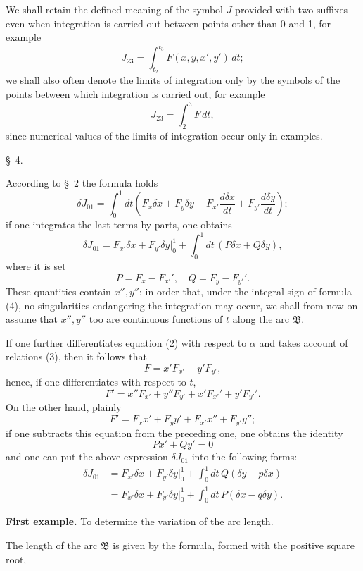 \documentclass[11pt,a4paper,leqno]{article}
\begin{document}
We shall retain the defined meaning of the symbol $J$ provided with two suffixes even when integration is carried out between points other than 0 and 1, for example
\[
 J_{23}=\int_{t_2}^{t_3}F(x,y,x',y')\,dt;
\]
we shall also often denote the limits of integration only by the symbols of the points between which integration is carried out, for example
\[
 J_{23}=\int_2^3 F\,dt,
\]
since numerical values of the limits of integration occur only in examples.


\begin{center}
\S~4.
\end{center}

According to \S~2 the formula holds
\[
\delta J_{01}=\int_0^1 dt\left(F_x\delta x+F_y\delta y+F_{x'}\frac{d\delta x}{dt}+F_{y'}\frac{d\delta y}{dt}\right);
\]
if one integrates the last terms by parts, one obtains
\[
\tag{4}
\delta J_{01}=F_{x'}\delta x+F_{y'}\delta y\bigg|_0^1+\int_0^1dt\,(P\delta x+Q\delta y),
\]
where it is set
\[
P=F_x-F_{x'}',\quad Q=F_y-F_{y'}'.
\]
These quantities contain \(x'',y''\); in order that, under the integral sign of formula (4), no singularities endangering the integration may occur, we shall from now on assume that \(x'',y''\) too are continuous functions of \(t\) along the arc \(\mathfrak B\).

If one further differentiates equation (2) with respect to \(\alpha\) and takes account of relations (3), then it follows that
\[
F=x'F_{x'}+y'F_{y'},
\]
hence, if one differentiates with respect to \(t\),
\[
F'=x''F_{x'}+y''F_{y'}+x'F_{x'}'+y'F_{y'}'.
\]
On the other hand, plainly
\[
F'=F_xx'+F_yy'+F_{x'}x''+F_{y'}y'';
\]
if one subtracts this equation from the preceding one, one obtains the identity
\[
\tag{5}
Px'+Qy'=0
\]
and one can put the above expression \(\delta J_{01}\) into the following forms:
\[
\tag{6}
\begin{aligned}
\delta J_{01}
&=F_{x'}\delta x+F_{y'}\delta y\bigg|_0^1+\int_0^1dt\,Q(\delta y-p\delta x)\\
&=F_{x'}\delta x+F_{y'}\delta y\bigg|_0^1+\int_0^1dt\,P(\delta x-q\delta y).
\end{aligned}
\]

\medskip
\noindent\textbf{First example.} To determine the variation of the arc length.

The length of the arc \(\mathfrak B\) is given by the formula, formed with the positive square root,
\end{document}
